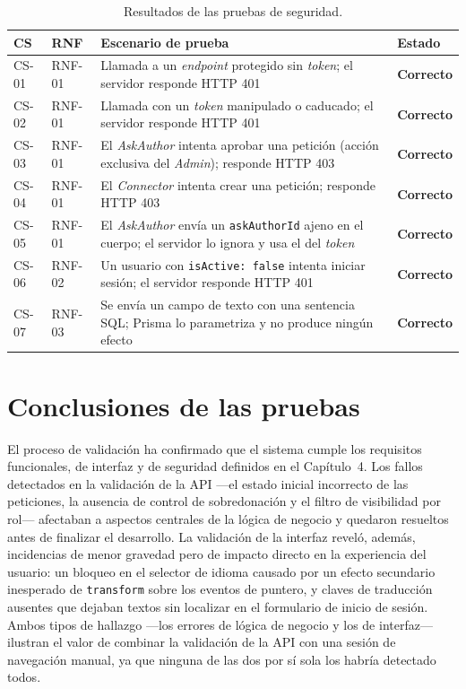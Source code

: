 \documentclass[11pt,oneside,spanish,listoffigures,listoftables]{tfgetsinf}
\begin{document}
\begin{table}[ht]
\centering
\caption[Resultados de las pruebas de seguridad]{Resultados de las pruebas de seguridad.}
\label{tab:pruebas-seguridad}
\footnotesize
\renewcommand{\arraystretch}{1.3}
\begin{tabularx}{\textwidth}{%
  >{\raggedright\arraybackslash}p{0.7cm}%
  >{\raggedright\arraybackslash}p{1.0cm}%
  >{\raggedright\arraybackslash}X%
  >{\raggedright\arraybackslash}p{1.4cm}}
\toprule
\textbf{CS} & \textbf{RNF} & \textbf{Escenario de prueba} & \textbf{Estado} \\
\midrule
CS-01 & RNF-01 & Llamada a un \textit{endpoint} protegido sin \textit{token}; el servidor responde HTTP 401 & \textbf{Correcto} \\
CS-02 & RNF-01 & Llamada con un \textit{token} manipulado o caducado; el servidor responde HTTP 401 & \textbf{Correcto} \\
CS-03 & RNF-01 & El \textit{AskAuthor} intenta aprobar una petición (acción exclusiva del \textit{Admin}); responde HTTP 403 & \textbf{Correcto} \\
CS-04 & RNF-01 & El \textit{Connector} intenta crear una petición; responde HTTP 403 & \textbf{Correcto} \\
CS-05 & RNF-01 & El \textit{AskAuthor} envía un \texttt{askAuthorId} ajeno en el cuerpo; el servidor lo ignora y usa el del \textit{token} & \textbf{Correcto} \\
CS-06 & RNF-02 & Un usuario con \texttt{isActive: false} intenta iniciar sesión; el servidor responde HTTP 401 & \textbf{Correcto} \\
CS-07 & RNF-03 & Se envía un campo de texto con una sentencia SQL; Prisma lo parametriza y no produce ningún efecto & \textbf{Correcto} \\
\bottomrule
\end{tabularx}
\end{table}

\section{Conclusiones de las pruebas}

El proceso de validación ha confirmado que el sistema cumple los requisitos funcionales, de interfaz y de seguridad definidos en el Capítulo~4. Los fallos detectados en la validación de la API —el estado inicial incorrecto de las peticiones, la ausencia de control de sobredonación y el filtro de visibilidad por rol— afectaban a aspectos centrales de la lógica de negocio y quedaron resueltos antes de finalizar el desarrollo. La validación de la interfaz reveló, además, incidencias de menor gravedad pero de impacto directo en la experiencia del usuario: un bloqueo en el selector de idioma causado por un efecto secundario inesperado de \texttt{transform} sobre los eventos de puntero, y claves de traducción ausentes que dejaban textos sin localizar en el formulario de inicio de sesión. Ambos tipos de hallazgo —los errores de lógica de negocio y los de interfaz— ilustran el valor de combinar la validación de la API con una sesión de navegación manual, ya que ninguna de las dos por sí sola los habría detectado todos.
\end{document}
